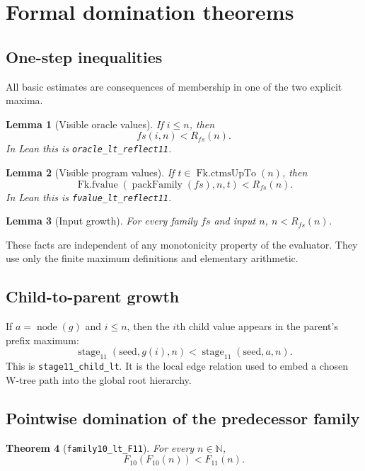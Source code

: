 \documentclass[11pt]{article}
\newtheorem{theorem}{Theorem}[section]
\newtheorem{lemma}[theorem]{Lemma}
\theoremstyle{definition}
\theoremstyle{remark}
\newcommand{\N}{\mathbb{N}}
\newcommand{\lean}[1]{\texttt{#1}}
\begin{document}
\section{Formal domination theorems}

\subsection{One-step inequalities}

All basic estimates are consequences of membership in one of the two explicit
maxima.

\begin{lemma}[Visible oracle values]
If $i\le n$, then
\[
  fs(i,n)<R_{fs}(n).
\]
In Lean this is \lean{oracle\_lt\_reflect11}.
\end{lemma}

\begin{lemma}[Visible program values]
If $t\in\operatorname{Fk.ctmsUpTo}(n)$, then
\[
  \operatorname{Fk.fvalue}(\operatorname{packFamily}(fs),n,t)
  <R_{fs}(n).
\]
In Lean this is \lean{fvalue\_lt\_reflect11}.
\end{lemma}

\begin{lemma}[Input growth]
For every family $fs$ and input $n$, $n<R_{fs}(n)$.
\end{lemma}

These facts are independent of any monotonicity property of the evaluator.
They use only the finite maximum definitions and elementary arithmetic.

\subsection{Child-to-parent growth}

If $a=\operatorname{node}(g)$ and $i\le n$, then the $i$th child value appears
in the parent's prefix maximum:
\[
  \operatorname{stage}_{11}(\mathrm{seed},g(i),n)
  <\operatorname{stage}_{11}(\mathrm{seed},a,n).
\]
This is \lean{stage11\_child\_lt}.  It is the local edge relation used to embed
a chosen W-tree path into the global root hierarchy.

\subsection{Pointwise domination of the predecessor family}

\begin{theorem}[\lean{family10\_lt\_F11}]
For every $n\in\N$,
\[
   F_{10}(F_{10}(n))<F_{11}(n).
\]
\end{theorem}
\end{document}
